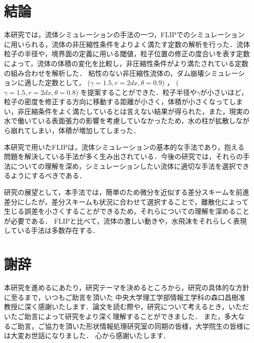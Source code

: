 \documentclass[a4j,12pt]{jreport}
\def\syaji{ \chapter*{謝辞} \addcontentsline{toc}{chapter}{謝辞}}
\begin{document}
\chapter{結論} \label{chapter:6}
本研究では，流体シミュレーションの手法の一つ，FLIPでのシミュレーションに用いられる，流体の非圧縮性条件をよりよく満たす定数の解析を行った．流体粒子の半径や，境界面の定義に用いる閾値，粒子位置の修正の度合いを表す定数によって，流体の体積の変化を比較し，非圧縮性条件がより満たされている定数の組み合わせを解析した．
粘性のない非圧縮性流体の，ダム崩壊シミュレーションに適した定数として， ($\gamma = 1.5,r = 2dx,\theta = 0.9$) ， ($\gamma = 1.5,r = 2dx,\theta = 0.8$) を提案することができた．粒子半径や$\gamma$が小さいほど，粒子の密度を修正する方向に移動する距離が小さく，体積が小さくなってしまい，非圧縮条件をよく満たしているとは言えない結果が得られた，また，現実の水で働いている表面張力の影響を考慮していなかったため，水の柱が拡散しながら崩れてしまい，体積が増加してしまった．

本研究で用いたFLIPは，流体シミュレーションの基本的な手法であり，抱える問題を解決している手法が多く生み出されている．今後の研究では，それらの手法についての理解を深め，シミュレーションしたい流体に適切な手法を選択できるようにするべきである．

研究の展望として，本手法では，簡単のため微分を近似する差分スキームを前進差分にしたが，差分スキームも状況に合わせて選択することで，離散化によって生じる誤差を小さくすることができるため，それらについての理解を深めることが必要である．
FLIPと比べて，流体の激しい動きや，水飛沫をそれらしく表現している手法は多数存在する．
\syaji
\par
本研究を進めるにあたり，研究テーマを決めるところから，研究の具体的な方針に至るまで，いつもご助言を頂いた
中央大学理工学部情報工学科の森口昌樹准教授に深く感謝いたします．論文を読む際や，研究について考えるとき，いただいたご助言によって研究をより深く理解することができました．
また，多大なるご助言，ご協力を頂いた形状情報処理研究室の同期の皆様，大学院生の皆様には大変お世話になりました．
心から感謝いたします．
\end{document}
